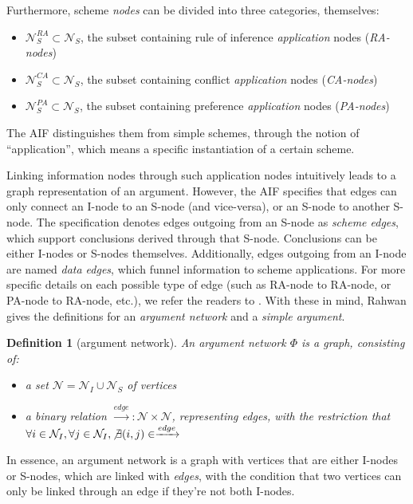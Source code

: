 \documentclass[12pt, a4paper]{article}
\newtheorem{Def}{Definition}[subsection]
\begin{document}
Furthermore, scheme \emph{nodes} can be divided into three categories, themselves:
\begin{itemize}
    \item $\mathcal{N}_S^{RA} \subset \mathcal{N}_S$, the subset containing rule of inference \emph{application} nodes (\emph{RA-nodes})
    \item $\mathcal{N}_S^{CA} \subset \mathcal{N}_S$, the subset containing conflict \emph{application} nodes (\emph{CA-nodes})
    \item $\mathcal{N}_S^{PA} \subset \mathcal{N}_S$, the subset containing preference \emph{application} nodes (\emph{PA-nodes})
\end{itemize}
The AIF distinguishes them from simple schemes, through the notion of ``application'', which means a specific instantiation of a certain scheme.

Linking information nodes through such application nodes intuitively leads to a graph representation of an argument. However, the AIF specifies that edges can only connect an I-node to an S-node (and vice-versa), or an S-node to another S-node. The specification denotes edges outgoing from an S-node as \emph{scheme edges}, which support conclusions derived through that S-node. Conclusions can be either I-nodes or S-nodes themselves. Additionally, edges outgoing from an I-node are named \emph{data edges}, which funnel information to scheme applications. For more specific details on each possible type of edge (such as RA-node to RA-node, or PA-node to RA-node, etc.), we refer the readers to \cite[Table 1]{aif}. With these in mind, Rahwan gives the definitions for an \emph{argument network} and a \emph{simple argument}.

\begin{Def}[argument network]
\sloppy An argument network $\Phi$ is a graph, consisting of:
\begin{itemize}
    \item a set $\mathcal{N} = \mathcal{N}_I \cup \mathcal{N}_S$ of vertices
    \item a binary relation $\xrightarrow{edge}:\mathcal{N}\times\mathcal{N}$, representing edges, with the restriction that $\forall i \in \mathcal{N}_I, \forall j \in \mathcal{N}_I, \not\exists (i,j)\in\xrightarrow{edge}$
\end{itemize}
\end{Def}
In essence, an argument network is a graph with vertices that are either I-nodes or S-nodes, which are linked with \emph{edges}, with the condition that two vertices can only be linked through an edge if they're not both I-nodes.
\end{document}
